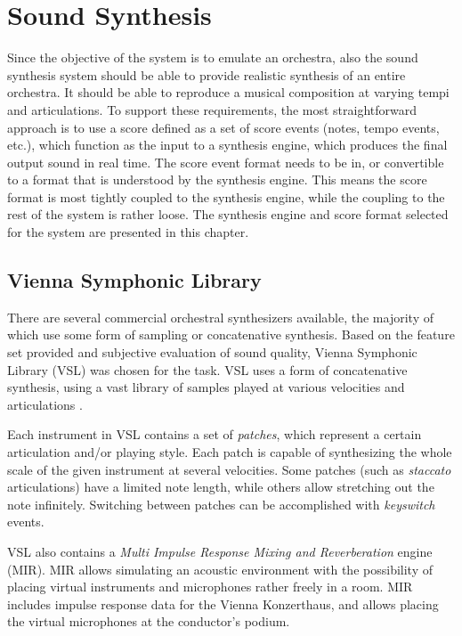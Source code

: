 
\chapter{Sound Synthesis}
\label{chapter:sound_synthesis}

Since the objective of the system is to emulate an orchestra,
also the sound synthesis system should be able to
provide realistic synthesis of an entire orchestra.
It should be able to reproduce a musical composition
at varying tempi and articulations.
To support these requirements,
the most straightforward approach is to use
a score defined as a set of score events
(notes, tempo events, etc.),
which function as the input to a synthesis engine,
which produces the final output sound in real time.
The score event format needs to be in,
or convertible to a format that is understood by the synthesis engine.
This means the score format is most tightly
coupled to the synthesis engine,
while the coupling to the rest of the system is rather loose.
The synthesis engine and score format selected for the system
are presented in this chapter.

\section{Vienna Symphonic Library}

There are several commercial orchestral synthesizers available,
the majority of which use some form of sampling or concatenative synthesis.
Based on the feature set provided and
subjective evaluation of sound quality,
Vienna Symphonic Library (VSL) \cite{vsl} was chosen for the task.
VSL uses a form of concatenative synthesis,
using a vast library of samples played at
various velocities and articulations \cite{schwartz2006}.

Each instrument in VSL contains a set of \textit{patches},
which represent a certain articulation and/or playing style.
Each patch is capable of synthesizing
the whole scale of the given instrument at several velocities.
Some patches (such as \textit{staccato} articulations)
have a limited note length,
while others allow stretching out the note infinitely.
Switching between patches can be accomplished with \textit{keyswitch} events.

VSL also contains a \textit{Multi Impulse Response Mixing and Reverberation}
engine (MIR).
MIR allows simulating an acoustic environment with
the possibility of placing virtual instruments and microphones
rather freely in a room.
MIR includes impulse response data for the Vienna Konzerthaus,
and allows placing the virtual microphones at the conductor's podium.


